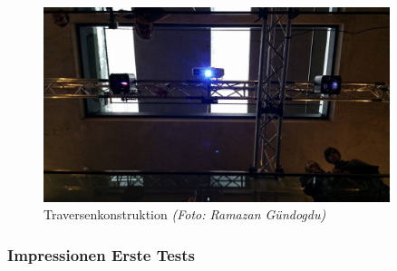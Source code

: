 \begin{figure}[htbp]
	\centering
		\includegraphics[width=0.9\textwidth]{images/TdM3.jpg}
	\caption{Traversenkonstruktion \textit{(Foto: Ramazan Gündogdu)}}
	\label{fig:TdM3}
\end{figure}


\subsubsection{Impressionen Erste Tests}